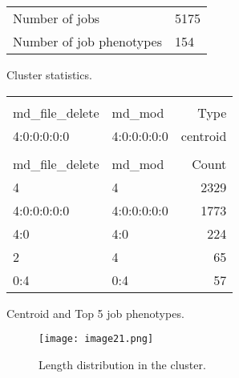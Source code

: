 \documentclass{jhps}
\begin{document}
\noindent\begin{minipage}{\textwidth}
\captionsetup{type=table}

\begingroup
  \begin{subtable}{\textwidth}
  \centering
  \begin{tabular}{ll}
    Number of jobs & 5175 \\
    Number of job phenotypes & 154 \\
  \end{tabular}
  \caption{Cluster statistics.}
  \label{fig:pm_quant:stats}
  \end{subtable}
\endgroup

\medskip

\begingroup
  \begin{subtable}{\textwidth}
  \centering
  \begin{tiny}
    \begin{tabular}{ll|r}
      \rowcolor{tblhead}
      \multicolumn{2}{l|}{Hexadecimal coding} &              \\
      \rowcolor{tblhead}
      md\_file\_delete     &  md\_mod     & Type     \\
      \hline
      4:0:0:0:0:0          &  4:0:0:0:0:0 & centroid \\
      \multicolumn{3}{l}{} \\
			\rowcolor{tblhead}
      md\_file\_delete     &  md\_mod     & Count    \\
      \hline
      4                    &  4           & 2329     \\
      4:0:0:0:0:0          &  4:0:0:0:0:0 & 1773     \\
      4:0                  &  4:0         & 224      \\
      2                    &  4           & 65       \\
      0:4                  &  0:4         & 57       \\
    \end{tabular}
  \end{tiny}
  \caption{Centroid and Top 5 job phenotypes.}
  \label{fig:pm_quant:top_jobs}
  \end{subtable}
\endgroup

\medskip

\begingroup
  \begin{subfigure}{\textwidth}
  \centering
  \texttt{[image: image21.png]}
  \caption{Length distribution in the cluster.}
  \label{fig:pm_quant:length}
  \end{subfigure}
\endgroup

\label{fig:pm_quant}
\end{minipage}
\end{document}
